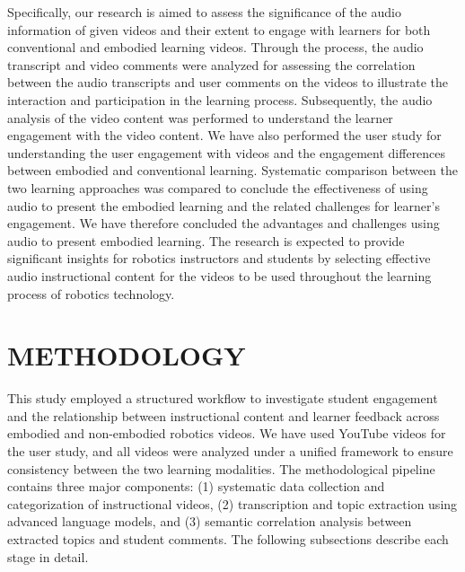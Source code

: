 Specifically, our research is aimed to assess the significance of the audio information of given videos and their extent to engage with learners for both conventional and embodied learning videos. Through the process, the audio transcript and video comments were analyzed for assessing the correlation between the audio transcripts and user comments on the videos to illustrate the interaction and participation in the learning process. Subsequently, the audio analysis of the video content was performed to understand the learner engagement with the video content.  We have also performed the user study for understanding the user engagement with videos and the engagement differences between embodied and conventional learning. Systematic comparison between the two learning approaches was compared to conclude the effectiveness of using audio to present the embodied learning and the related challenges for learner's engagement.  We have therefore concluded the advantages and challenges using audio to present embodied learning.  The research is expected to provide significant insights for robotics instructors and students by selecting effective audio instructional content for the videos to be used throughout the learning process of robotics technology. 








\section{METHODOLOGY}





This study employed a structured workflow to investigate student engagement and the relationship between instructional content and learner feedback across embodied and non-embodied robotics videos.  We have used YouTube videos for the user study, and all videos were analyzed under a unified framework to ensure consistency between the two learning modalities. The methodological pipeline contains three major components: (1) systematic data collection and categorization of instructional videos, (2) transcription and topic extraction using advanced language models, and (3) semantic correlation analysis between extracted topics and student comments. The following subsections describe each stage in detail.




